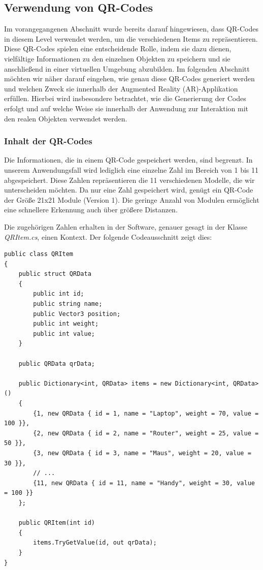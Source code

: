 \subsection{Verwendung von QR-Codes}
Im vorangegangenen Abschnitt wurde bereits darauf hingewiesen, dass QR-Codes in diesem Level verwendet werden,
um die verschiedenen Items zu repräsentieren. Diese QR-Codes spielen eine entscheidende Rolle, indem sie dazu dienen,
vielfältige Informationen zu den einzelnen Objekten zu speichern und sie anschließend in einer virtuellen Umgebung
abzubilden. Im folgenden Abschnitt möchten wir näher darauf eingehen, wie genau diese QR-Codes generiert werden
und welchen Zweck sie innerhalb der Augmented Reality (AR)-Applikation erfüllen. Hierbei wird insbesondere betrachtet,
wie die Generierung der Codes erfolgt und auf welche Weise sie innerhalb der Anwendung zur Interaktion mit den realen Objekten verwendet werden.

\subsubsection{Inhalt der QR-Codes}
Die Informationen, die in einem QR-Code gespeichert werden, sind begrenzt. In unserem Anwendungsfall wird lediglich eine
einzelne Zahl im Bereich von 1 bis 11 abgespeichert. Diese Zahlen repräsentieren die 11 verschiedenen Modelle, die wir
unterscheiden möchten. Da nur eine Zahl gespeichert wird, genügt ein QR-Code der Größe 21x21 Module (Version 1). Die
geringe Anzahl von Modulen ermöglicht eine schnellere Erkennung auch über größere Distanzen.

Die zugehörigen Zahlen erhalten in der Software, genauer gesagt in der Klasse \textit{QRItem.cs}, einen Kontext. Der folgende Codeausschnitt zeigt dies:

\begin{lstlisting}[style=csharp, caption={}, label=code:update]
public class QRItem
{
    public struct QRData
    {
        public int id;
        public string name;
        public Vector3 position;
        public int weight;
        public int value;
    }

    public QRData qrData;

    public Dictionary<int, QRData> items = new Dictionary<int, QRData>()
    {
        {1, new QRData { id = 1, name = "Laptop", weight = 70, value = 100 }},
        {2, new QRData { id = 2, name = "Router", weight = 25, value = 50 }},
        {3, new QRData { id = 3, name = "Maus", weight = 20, value = 30 }},
        // ...
        {11, new QRData { id = 11, name = "Handy", weight = 30, value = 100 }}
    };

    public QRItem(int id)
    {
        items.TryGetValue(id, out qrData);
    }
}
\end{lstlisting}

